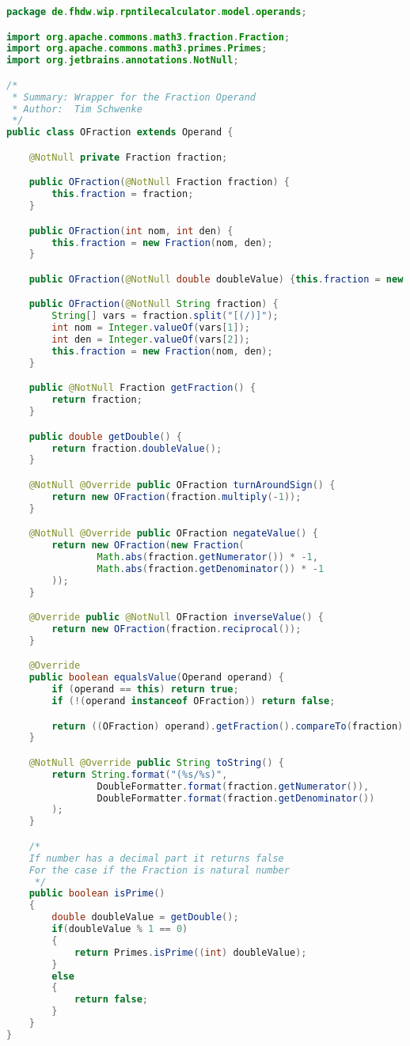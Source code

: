 \begin{lstlisting}[caption=OFraction (Schwenke),label=list:OFraction,language=Java]
package de.fhdw.wip.rpntilecalculator.model.operands;

import org.apache.commons.math3.fraction.Fraction;
import org.apache.commons.math3.primes.Primes;
import org.jetbrains.annotations.NotNull;

/*
 * Summary: Wrapper for the Fraction Operand
 * Author:  Tim Schwenke
 */
public class OFraction extends Operand {

    @NotNull private Fraction fraction;

    public OFraction(@NotNull Fraction fraction) {
        this.fraction = fraction;
    }

    public OFraction(int nom, int den) {
        this.fraction = new Fraction(nom, den);
    }

    public OFraction(@NotNull double doubleValue) {this.fraction = new Fraction(doubleValue); }

    public OFraction(@NotNull String fraction) {
        String[] vars = fraction.split("[(/)]");
        int nom = Integer.valueOf(vars[1]);
        int den = Integer.valueOf(vars[2]);
        this.fraction = new Fraction(nom, den);
    }

    public @NotNull Fraction getFraction() {
        return fraction;
    }

    public double getDouble() {
        return fraction.doubleValue();
    }

    @NotNull @Override public OFraction turnAroundSign() {
        return new OFraction(fraction.multiply(-1));
    }

    @NotNull @Override public OFraction negateValue() {
        return new OFraction(new Fraction(
                Math.abs(fraction.getNumerator()) * -1,
                Math.abs(fraction.getDenominator()) * -1
        ));
    }

    @Override public @NotNull OFraction inverseValue() {
        return new OFraction(fraction.reciprocal());
    }

    @Override
    public boolean equalsValue(Operand operand) {
        if (operand == this) return true;
        if (!(operand instanceof OFraction)) return false;

        return ((OFraction) operand).getFraction().compareTo(fraction) == 0;
    }

    @NotNull @Override public String toString() {
        return String.format("(%s/%s)",
                DoubleFormatter.format(fraction.getNumerator()),
                DoubleFormatter.format(fraction.getDenominator())
        );
    }

    /*
    If number has a decimal part it returns false
    For the case if the Fraction is natural number
     */
    public boolean isPrime()
    {
        double doubleValue = getDouble();
        if(doubleValue % 1 == 0)
        {
            return Primes.isPrime((int) doubleValue);
        }
        else
        {
            return false;
        }
    }
}
\end{lstlisting}    

